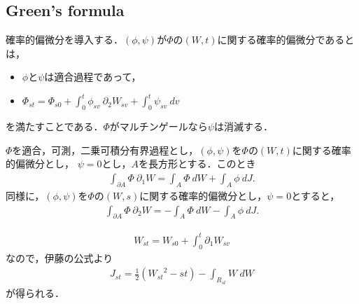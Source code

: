 \subsection{Green's formula}
	確率的偏微分を導入する．$(\phi,\psi)$が$\Phi$の$(W,t)$に関する確率的偏微分であるとは，
	\begin{itemize}
		\item $\phi$と$\psi$は適合過程であって，
		\item $\Phi_{st} = \Phi_{s0} + \int_{0}^{t} \phi_{sv}\ \partial_{2} W_{sv} + \int_{0}^{t} \psi_{sv}\ dv$
	\end{itemize}
	を満たすことである．$\Phi$がマルチンゲールなら$\psi$は消滅する．
	
	\begin{thm}[長方形に対するGreenの公式]
		$\Phi$を適合，可測，二乗可積分有界過程とし，$(\phi,\psi)$を$\Phi$の$(W,t)$に関する確率的偏微分とし，
		$\psi = 0$とし，$A$を長方形とする．このとき
		\begin{align}
			\int_{\partial A} \Phi\ \partial_{1}W = \int_{A} \Phi\ dW + \int_{A} \phi\ dJ.
		\end{align}
		同様に，$(\phi,\psi)$を$\Phi$の$(W,s)$に関する確率的偏微分とし，$\psi = 0$とすると，
		\begin{align}
			\int_{\partial A} \Phi\ \partial_{2}W = -\int_{A} \Phi\ dW - \int_{A} \phi\ dJ.
		\end{align}
	\end{thm}
	
	\begin{align}
		W_{st} = W_{s0} + \int_{0}^{t} \partial_{1}W_{sv}
	\end{align}
	なので，伊藤の公式より
	\begin{align}
		J_{st} = \frac{1}{2}\left({W_{st}}^{2} - st\right) - \int_{R_{st}} W\ dW
	\end{align}
	が得られる．